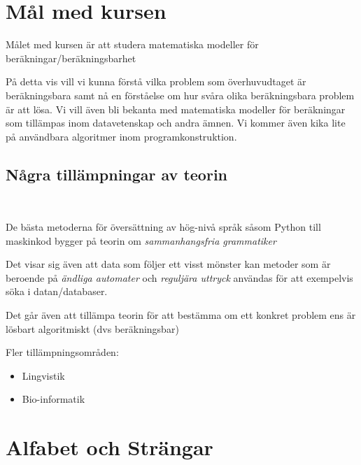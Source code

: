 \section{Mål med kursen}
\par\bigskip
\noindent Målet med kursen är att studera matematiska modeller för beräkningar/beräkningsbarhet\par
\noindent På detta vis vill vi kunna förstå vilka problem som överhuvudtaget är beräkningsbara samt nå en förståelse om hur svåra olika beräkningsbara problem är att lösa. Vi vill även bli bekanta med matematiska modeller för beräkningar som tillämpas inom datavetenskap och andra ämnen. Vi kommer även kika lite på användbara algoritmer inom programkonstruktion.
\par\bigskip
\subsection{Några tillämpningar av teorin}\hfill\\
\par
\noindent De bästa metoderna för översättning av hög-nivå språk såsom Python till maskinkod bygger på teorin om \textit{sammanhangsfria grammatiker}\par\bigskip
\noindent Det visar sig även att data som följer ett visst mönster kan metoder som är beroende på \textit{ändliga automater} och \textit{reguljära uttryck} användas för att exempelvis söka i datan/databaser.\par\bigskip
\noindent Det går även att tillämpa teorin för att bestämma om ett konkret problem ens är lösbart algoritmiskt (dvs beräkningsbar)\par\bigskip
\noindent Fler tillämpningsområden:
\begin{itemize}
  \item Lingvistik
  \item Bio-informatik
\end{itemize}
\newpage
\section{Alfabet och Strängar}
